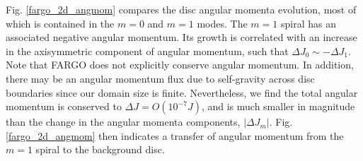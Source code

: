 Fig. \ref{fargo_2d_angmom} compares the disc angular momenta
evolution, most of which is contained in the $m=0$ and $m=1$ modes. 
The $m=1$ spiral has an associated negative angular
momentum. Its growth is correlated with an increase in the axisymmetric
component of angular momentum, such that $\Delta J_0 \sim - \Delta
J_1$. Note that FARGO does not explicitly conserve angular
momentum. In addition, there may be an angular momentum flux due to
self-gravity across disc boundaries since our domain size is finite. 
Nevertheless, we find the total angular momentum is conserved to 
$\Delta J = O(10^{-7}J)$, and is much smaller in magnitude than the change in the
angular momenta components, $|\Delta J_m|$. 
Fig. \ref{fargo_2d_angmom} then indicates a transfer of 
angular momentum from the $m=1$ spiral to the background disc. 

